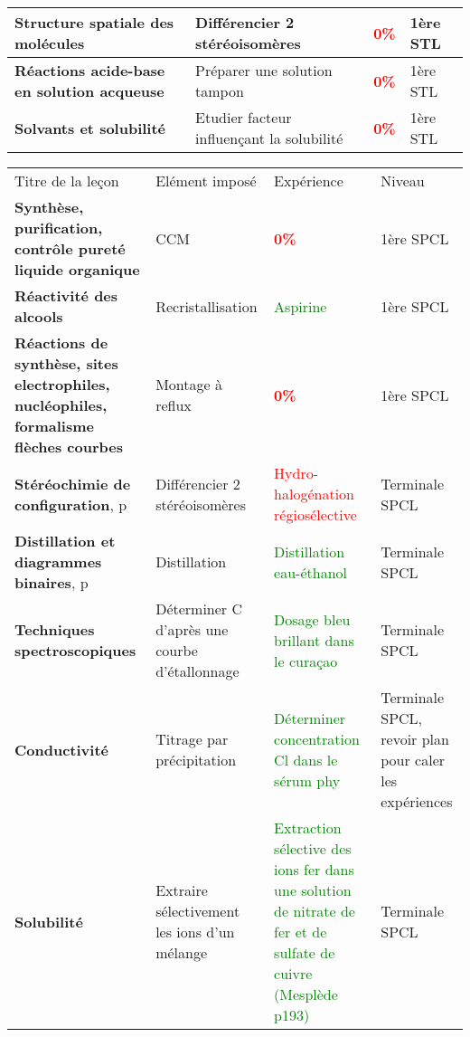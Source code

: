 \begin{changemargin}{-1.5cm}{-0cm}
\begin{tabularx}{\paperwidth-2cm}{| X | X | c | X |}
  \hline
  \hline
   \textbf{Structure spatiale des molécules} & Différencier 2 stéréoisomères & \textcolor{red}{\textbf{0\%}}  & 1ère STL  \\
  \hline
  \textbf{Réactions acide-base en solution acqueuse} & Préparer une solution tampon & \textcolor{red}{\textbf{0\%}}  & 1ère STL  \\
  \hline
  \textbf{Solvants et solubilité} & Etudier facteur influençant la solubilité & \textcolor{red}{\textbf{0\%}}  & 1ère STL  \\
  \hline
\end{tabularx}
\end{changemargin}

\newpage

\begin{changemargin}{-1.5cm}{0cm}
\begin{tabularx}{\paperwidth-2cm}{| X | X | X | X |}
  \hline
  \rowcolor{gray!20}\multicolumn{4}{c}{Avancement préparation oraux Leçons Chimie} \\
  \hline 
  Titre de la leçon & Elément imposé & Expérience & Niveau \\
  \hline
  \textbf{Synthèse, purification, contrôle pureté liquide organique} & CCM & \textcolor{red}{\textbf{0\%}}  & 1ère SPCL  \\
  \hline
  \textbf{Réactivité des alcools} & Recristallisation & \textcolor{green}{Aspirine}  & 1ère SPCL  \\
  \hline
  \textbf{Réactions de synthèse, sites electrophiles, nucléophiles, formalisme flèches courbes} & Montage à reflux & \textcolor{red}{\textbf{0\%}}  & 1ère SPCL \\
  \hline
  \textbf{Stéréochimie de configuration}, p\pageref{LC_Stéréochimie} & Différencier 2 stéréoisomères & \textcolor{red}{Hydro-halogénation régiosélective}  & Terminale SPCL \\
  \hline
  \textbf{Distillation et diagrammes binaires}, p\pageref{LC_Distillation} & Distillation & \textcolor{green}{Distillation eau-éthanol}  & Terminale SPCL \\
  \hline
   \textbf{Techniques spectroscopiques} & Déterminer C d'après une courbe d'étallonnage & \textcolor{green}{Dosage bleu brillant dans le curaçao}  & Terminale SPCL \\
  \hline
  \textbf{Conductivité} & Titrage par précipitation & \textcolor{green}{Déterminer concentration Cl dans le sérum phy}  & Terminale SPCL, revoir plan pour caler les expériences\\
  \hline
  \textbf{Solubilité} & Extraire sélectivement les ions d'un mélange & \textcolor{green}{Extraction sélective des ions fer dans une solution de nitrate de fer et de sulfate de cuivre (Mesplède p193)}  & Terminale SPCL \\

\end{tabularx}
\end{changemargin}
